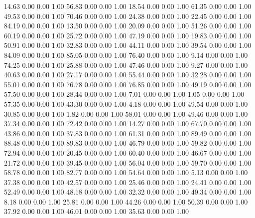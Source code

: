    14.63   0.00   0.00   1.00
   56.83   0.00   0.00   1.00
   18.54   0.00   0.00   1.00
   61.35   0.00   0.00   1.00
   49.53   0.00   0.00   1.00
   70.46   0.00   0.00   1.00
   24.38   0.00   0.00   1.00
   22.45   0.00   0.00   1.00
   84.19   0.00   0.00   1.00
   13.50   0.00   0.00   1.00
   20.09   0.00   0.00   1.00
   51.26   0.00   0.00   1.00
   60.19   0.00   0.00   1.00
   25.72   0.00   0.00   1.00
   47.19   0.00   0.00   1.00
   19.83   0.00   0.00   1.00
   50.91   0.00   0.00   1.00
   32.83   0.00   0.00   1.00
   44.11   0.00   0.00   1.00
   39.54   0.00   0.00   1.00
   84.09   0.00   0.00   1.00
   85.05   0.00   0.00   1.00
   76.40   0.00   0.00   1.00
    9.14   0.00   0.00   1.00
   74.25   0.00   0.00   1.00
   25.88   0.00   0.00   1.00
   47.46   0.00   0.00   1.00
    9.27   0.00   0.00   1.00
   40.63   0.00   0.00   1.00
   27.17   0.00   0.00   1.00
   55.44   0.00   0.00   1.00
   32.28   0.00   0.00   1.00
   55.01   0.00   0.00   1.00
   76.78   0.00   0.00   1.00
   76.85   0.00   0.00   1.00
   49.19   0.00   0.00   1.00
   57.50   0.00   0.00   1.00
   28.44   0.00   0.00   1.00
    7.01   0.00   0.00   1.00
    1.05   0.00   0.00   1.00
   57.35   0.00   0.00   1.00
   43.30   0.00   0.00   1.00
    4.18   0.00   0.00   1.00
   49.54   0.00   0.00   1.00
   30.85   0.00   0.00   1.00
    1.82   0.00   0.00   1.00
   58.01   0.00   0.00   1.00
   49.46   0.00   0.00   1.00
   37.34   0.00   0.00   1.00
   72.42   0.00   0.00   1.00
   14.27   0.00   0.00   1.00
   67.70   0.00   0.00   1.00
   43.86   0.00   0.00   1.00
   37.83   0.00   0.00   1.00
   61.31   0.00   0.00   1.00
   89.49   0.00   0.00   1.00
   88.48   0.00   0.00   1.00
   89.83   0.00   0.00   1.00
   46.79   0.00   0.00   1.00
   59.82   0.00   0.00   1.00
   72.94   0.00   0.00   1.00
   20.45   0.00   0.00   1.00
   60.40   0.00   0.00   1.00
   46.67   0.00   0.00   1.00
   21.72   0.00   0.00   1.00
   39.45   0.00   0.00   1.00
   56.04   0.00   0.00   1.00
   59.70   0.00   0.00   1.00
   58.78   0.00   0.00   1.00
   82.77   0.00   0.00   1.00
   54.64   0.00   0.00   1.00
    5.13   0.00   0.00   1.00
   37.38   0.00   0.00   1.00
   42.57   0.00   0.00   1.00
   25.46   0.00   0.00   1.00
   24.41   0.00   0.00   1.00
   52.49   0.00   0.00   1.00
   48.18   0.00   0.00   1.00
   32.32   0.00   0.00   1.00
   49.34   0.00   0.00   1.00
    8.18   0.00   0.00   1.00
   25.81   0.00   0.00   1.00
   44.26   0.00   0.00   1.00
   50.39   0.00   0.00   1.00
   37.92   0.00   0.00   1.00
   46.01   0.00   0.00   1.00
   35.63   0.00   0.00   1.00
